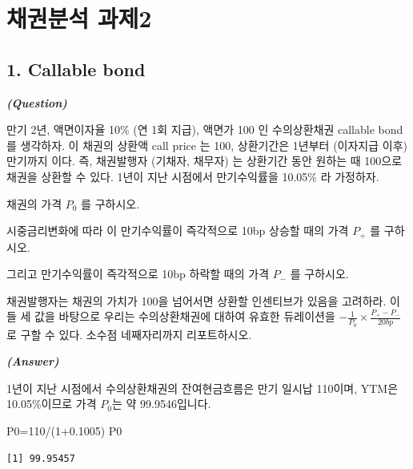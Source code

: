 \documentclass[
  a4paper,
  DIV=11,
  numbers=noendperiod]{scrreprt}
\newenvironment{Shaded}{\begin{snugshade}}{\end{snugshade}}
\newcommand{\DecValTok}[1]{\textcolor[rgb]{0.68,0.00,0.00}{#1}}
\newcommand{\FloatTok}[1]{\textcolor[rgb]{0.68,0.00,0.00}{#1}}
\newcommand{\NormalTok}[1]{\textcolor[rgb]{0.00,0.23,0.31}{#1}}
\newcommand{\OtherTok}[1]{\textcolor[rgb]{0.00,0.23,0.31}{#1}}
\newcommand{\SpecialCharTok}[1]{\textcolor[rgb]{0.37,0.37,0.37}{#1}}
\begin{document}
\chapter*{채권분석 과제2}\label{uxcc44uxad8cuxbd84uxc11d-uxacfcuxc81c2}


\section*{1. Callable bond}\label{callable-bond}


\textbf{\emph{(Question)}}

만기 2년, 액면이자율 10\% (연 1회 지급), 액면가 100 인 수의상환채권
callable bond 를 생각하자. 이 채권의 상환액 call price 는 100,
상환기간은 1년부터 (이자지급 이후) 만기까지 이다. 즉, 채권발행자
(기채자, 채무자) 는 상환기간 동안 원하는 때 100으로 채권을 상환할 수
있다. 1년이 지난 시점에서 만기수익률을 10.05\% 라 가정하자.

채권의 가격 \(P_0\) 를 구하시오.

시중금리변화에 따라 이 만기수익률이 즉각적으로 10bp 상승할 때의 가격
\(P_+\) 를 구하시오.

그리고 만기수익률이 즉각적으로 10bp 하락할 때의 가격 \(P_−\) 를
구하시오.

채권발행자는 채권의 가치가 100을 넘어서면 상환할 인센티브가 있음을
고려하라. 이들 세 값을 바탕으로 우리는 수의상환채권에 대하여 유효한
듀레이션을 \(-\frac{1}{P_0}\times\frac{P_+-P_-}{20bp}\)로 구할 수 있다.
소수점 네째자리까지 리포트하시오.

\textbf{\emph{(Answer)}}

1년이 지난 시점에서 수의상환채권의 잔여현금흐름은 만기 일시납 110이며,
YTM은 10.05\%이므로 가격 \(P_0\)는 약 99.9546입니다.

\begin{Shaded}
\begin{Highlighting}[]
\NormalTok{P0}\OtherTok{=}\DecValTok{110}\SpecialCharTok{/}\NormalTok{(}\DecValTok{1}\FloatTok{+0.1005}\NormalTok{)}
\NormalTok{P0}
\end{Highlighting}
\end{Shaded}

\begin{verbatim}
[1] 99.95457
\end{verbatim}
\end{document}
